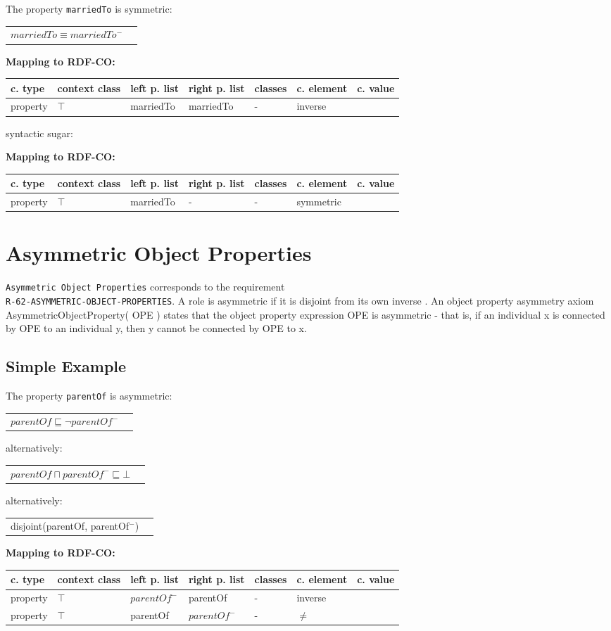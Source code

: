 \documentclass{llncs}
\newcommand{\ms}[1]{\texttt{#1}}
\newenvironment{gcotable}{
  \scriptsize
  \sffamily
  \vspace{0cm}
	\begin{center}
	\textbf{\vspace{0.4cm}Mapping to RDF-CO:} \\
  \begin{tabular}{l|l|l|l|l|l|l}
	\hline
  \textbf{c. type} & \textbf{context class} & \textbf{left p. list} & \textbf{right p. list} & \textbf{classes} & \textbf{c. element} & \textbf{c. value} \\
  \hline

}{
  \hline
  \end{tabular}
	\end{center}
}
\newenvironment{DL}{
  \vspace{0cm}
	\begin{center}
  \begin{tabular}{r l}

}{
  \end{tabular}
	\end{center}
}
\begin{document}
The property \ms{marriedTo} is symmetric:

\begin{DL}
$marriedTo \equiv marriedTo^{-}$ \\
\end{DL}

\begin{gcotable}
property & $\top$ & marriedTo & marriedTo & - & inverse \\
\end{gcotable}

syntactic sugar:

\begin{gcotable}
property & $\top$ & marriedTo & - & - & symmetric \\
\end{gcotable}

\section{Asymmetric Object Properties}

\ms{Asymmetric Object Properties} corresponds to the requirement \\
\ms{R-62-ASYMMETRIC-OBJECT-PROPERTIES}.
A role is asymmetric if it is disjoint from its own inverse \cite{Kroetzsch2012}.
An object property asymmetry axiom AsymmetricObjectProperty( OPE ) states that the object property expression OPE is asymmetric - that is, if an individual x is connected by OPE to an individual y, then y cannot be connected by OPE to x. 

\subsection{Simple Example}

The property \ms{parentOf} is asymmetric:

\begin{DL}
$parentOf \sqsubseteq \neg parentOf^{-}$ 
\end{DL}

alternatively:

\begin{DL}
$parentOf \sqcap parentOf^{-} \sqsubseteq \bot$ 
\end{DL}

alternatively:

\begin{DL}
disjoint(parentOf, parentOf$^{-}$)
\end{DL}

\begin{gcotable}
property & $\top$ & $parentOf^{-}$ & parentOf & - & inverse \\
property & $\top$ & parentOf & $parentOf^{-}$ & - & $\ne$ \\
\end{gcotable}
\end{document}
